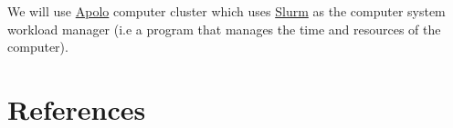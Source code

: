 \documentclass[
  letterpaper,
  DIV=11,
  numbers=noendperiod]{scrreprt}
\newlength{\cslhangindent}
\newlength{\cslentryspacingunit} %
\newenvironment{CSLReferences}[2] %
 {%
  \setlength{\parindent}{0pt}
  \ifodd #1
  \let\oldpar\par
  \def\par{\hangindent=\cslhangindent\oldpar}
  \fi
  \setlength{\parskip}{#2\cslentryspacingunit}
 }%
 {}
\begin{document}
We will use \href{}{Apolo} computer cluster which uses \href{}{Slurm} as
the computer system workload manager (i.e a program that manages the
time and resources of the computer).

\hypertarget{references}{%
\chapter*{References}\label{references}}

\hypertarget{refs}{}
\begin{CSLReferences}{0}{0}
\end{CSLReferences}
\end{document}
